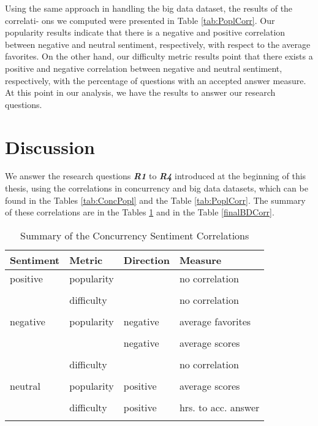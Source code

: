 Using the same approach in handling the big data dataset, the results of the correlati- ons we computed were presented in Table \ref{tab:PoplCorr}. Our popularity results indicate that there is a negative and positive correlation between negative and neutral sentiment, respectively, with respect to the average favorites. On the other hand, our difficulty metric results point that there exists a positive and negative correlation between negative and neutral sentiment, respectively, with the percentage of questions with an accepted answer measure. At this point in our analysis, we have the results to answer our research questions.

\section{Discussion}
\label{finalSectionResults}

We answer the research questions \emph{\textbf{R1}} to \emph{\textbf{R4}} introduced at the beginning of this thesis, using the correlations in concurrency and big data datasets, which can be found in the Tables \ref{tab:ConcPopl} and the Table \ref{tab:PoplCorr}. The summary of these correlations are in the Tables \ref{finalCDCorr} and in the Table \ref{finalBDCorr}.

\begin{table}[h!tb]
\caption{Summary of the Concurrency Sentiment Correlations}
\label{finalCDCorr}
\centering
\begin{tabular}{llll} \hline
\textbf{Sentiment} & \textbf{Metric} & \textbf{Direction}&\textbf{Measure}\\ \hline
positive & popularity & & no correlation \\
\\
& difficulty & & no correlation\\
\\
negative & popularity & negative & average favorites\\
\\
& & negative & average scores\\ 
\\
& difficulty & & no correlation \\
\\
neutral & popularity & positive & average scores \\
\\
& difficulty & positive & hrs. to acc. answer \\ \hline
\\
\end{tabular}
\end{table}

